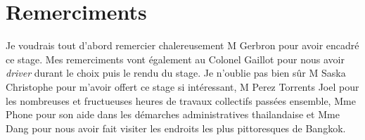 \section*{Remerciments}

Je voudrais tout d'abord remercier chalereusement M Gerbron pour avoir encadré ce stage. Mes remerciments vont également au Colonel Gaillot pour nous avoir \textit{driver} durant le choix puis le rendu du stage. Je n'oublie pas bien sûr M Saska Christophe pour m'avoir offert ce stage si intéressant, M  Perez Torrents Joel pour les nombreuses et fructueuses heures de travaux collectifs passées ensemble, Mme Phone pour son aide dans les démarches administratives thailandaise et Mme Dang pour nous avoir fait visiter les endroits les plus pittoresques de Bangkok.
